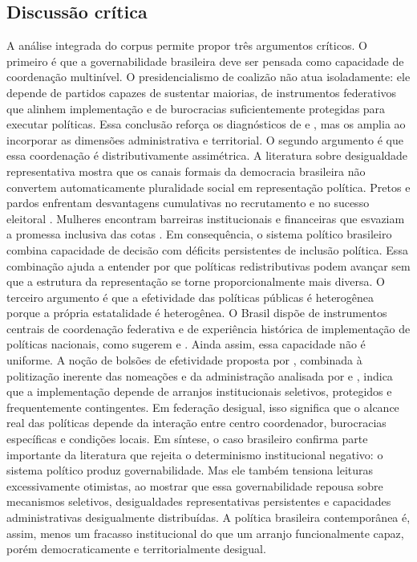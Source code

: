 \documentclass[12pt,a4paper]{article}
\begin{document}
\subsection{Discussão crítica}
\label{sec:org18a05e4}
A análise integrada do corpus permite propor três argumentos críticos. O primeiro é que a governabilidade brasileira deve ser pensada como capacidade de coordenação multinível. O presidencialismo de coalizão não atua isoladamente: ele depende de partidos capazes de sustentar maiorias, de instrumentos federativos que alinhem implementação e de burocracias suficientemente protegidas para executar políticas. Essa conclusão reforça os diagnósticos de \textcite{limongi2017_a_crise} e \textcite{palermo2000_como_se}, mas os amplia ao incorporar as dimensões administrativa e territorial.
O segundo argumento é que essa coordenação é distributivamente assimétrica. A literatura sobre desigualdade representativa mostra que os canais formais da democracia brasileira não convertem automaticamente pluralidade social em representação política. Pretos e pardos enfrentam desvantagens cumulativas no recrutamento e no sucesso eleitoral \parencite{campos2017_o_que}. Mulheres encontram barreiras institucionais e financeiras que esvaziam a promessa inclusiva das cotas \parencite{sacchet2018_why_gender,gatto2025_resistance_to}. Em consequência, o sistema político brasileiro combina capacidade de decisão com déficits persistentes de inclusão política. Essa combinação ajuda a entender por que políticas redistributivas podem avançar sem que a estrutura da representação se torne proporcionalmente mais diversa.
O terceiro argumento é que a efetividade das políticas públicas é heterogênea porque a própria estatalidade é heterogênea. O Brasil dispõe de instrumentos centrais de coordenação federativa e de experiência histórica de implementação de políticas nacionais, como sugerem \textcite{arretche2018_democracia_e} e \textcite{oliveira2019_momentos_da}. Ainda assim, essa capacidade não é uniforme. A noção de bolsões de efetividade proposta por \textcite{mcdonnell2020_patchwork_leviathan}, combinada à politização inerente das nomeações e da administração analisada por \textcite{panizza2022_the_politics} e \textcite{guy2022_bringing_political}, indica que a implementação depende de arranjos institucionais seletivos, protegidos e frequentemente contingentes. Em federação desigual, isso significa que o alcance real das políticas depende da interação entre centro coordenador, burocracias específicas e condições locais.
Em síntese, o caso brasileiro confirma parte importante da literatura que rejeita o determinismo institucional negativo: o sistema político produz governabilidade. Mas ele também tensiona leituras excessivamente otimistas, ao mostrar que essa governabilidade repousa sobre mecanismos seletivos, desigualdades representativas persistentes e capacidades administrativas desigualmente distribuídas. A política brasileira contemporânea é, assim, menos um fracasso institucional do que um arranjo funcionalmente capaz, porém democraticamente e territorialmente desigual.
\end{document}
